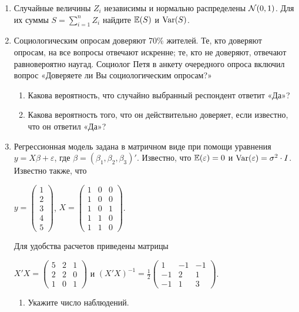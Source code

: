\documentclass[12pt, a4paper]{article}\usepackage[]{graphicx}\usepackage[]{color}
\begin{document}
\begin{enumerate}
\item Случайные величины $Z_i$ независимы и нормально распределены $\mathcal{N}(0,1)$. Для их суммы $S=\sum_{i=1}^n Z_i$ найдите $\mathbb{E}(S)$ и $\operatorname{Var}(S)$.
\item Социологическим опросам доверяют 70\% жителей. Те, кто доверяют
опросам, на все вопросы отвечают искренне; те, кто не доверяют, отвечают равновероятно наугад. Социолог Петя в анкету очередного опроса включил вопрос «Доверяете ли Вы социологическим опросам?»
\begin{enumerate}
\item Какова вероятность, что случайно выбранный респондент ответит «Да»?
\item Какова вероятность того, что он действительно доверяет, если известно, что он ответил
«Да»?
\end{enumerate}
\item Регрессионная модель  задана в матричном виде при помощи уравнения $y=X\beta+\varepsilon$, где $\beta=(\beta_1,\beta_2,\beta_3)'$.
Известно, что $\mathbb{E}(\varepsilon)=0$  и  $\operatorname{Var}(\varepsilon)=\sigma^2\cdot I$.
Известно также, что

$y=\left(
\begin{array}{c}
1\\
2\\
3\\
4\\
5
\end{array}\right)$,
$X=\left(\begin{array}{ccc}
1 & 0 & 0 \\
1 & 0 & 0 \\
1 & 0 & 1 \\
1 & 1 & 0 \\
1 & 1 & 0
\end{array}\right)$.


Для удобства расчетов приведены матрицы


$X'X=\left(
\begin{array}{ccc}
5 & 2 & 1\\
2 & 2 & 0\\
1 & 0 & 1
\end{array}\right)$ и $(X'X)^{-1}=\frac{1}{2}\left(
\begin{array}{ccc}
1 & -1 & -1 \\
-1 & 2 & 1 \\
-1 & 1 & 3
\end{array}\right)$.

\begin{enumerate}
\item Укажите число наблюдений.


\end{enumerate}
\end{enumerate}
\end{document}
